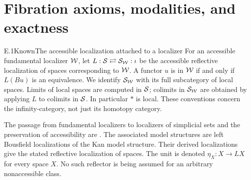 \section{Fibration axioms, modalities, and exactness}

\begin{claim}{E.1}{Known}{The accessible localization attached to a localizer}
For an accessible fundamental localizer $\mathcal{W}$, let
$L:\mathcal{S}\rightleftarrows\mathcal{S}_{\mathcal{W}}:\iota$ be the accessible reflective
localization of spaces corresponding to $\mathcal{W}$. A functor $u$ is in
$\mathcal{W}$ if and only if $L(Bu)$ is an equivalence. We identify
$\mathcal{S}_{\mathcal{W}}$ with its full subcategory of local spaces. Limits of
local spaces are computed in $\mathcal{S}$; colimits in $\mathcal{S}_{\mathcal{W}}$ are
obtained by applying $L$ to colimits in $\mathcal{S}$. In particular $*$
is local. These conventions concern the infinity-category, not
just its homotopy category.
\end{claim}
The passage from fundamental localizers to localizers of simplicial
sets and the preservation of accessibility are
\citet[Theorem 4.2.15, Remark 4.2.16]{RootCisinski2006}. The associated
model structures are left Bousfield localizations of the Kan model
structure. Their derived localizations give the stated reflective
localization of spaces. The unit is denoted
$\eta_X:X\to LX$ for every space $X$. No such reflector is being
assumed for an arbitrary nonaccessible class.

